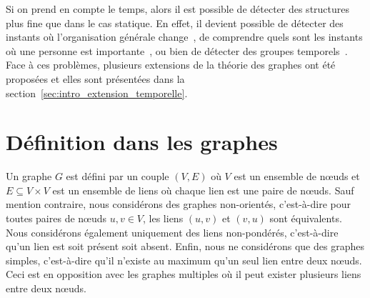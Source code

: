 Si on prend en compte le temps, alors il est possible de détecter des structures plus fine que dans le cas statique.
En effet, il devient possible de détecter des instants où l'organisation générale change~\cite{Rosvall2010}, de comprendre quels sont les instants où une personne est importante~\cite{Magnien2015}, ou bien de détecter des groupes temporels~\cite{Cazabet2010}.
Face à ces problèmes, plusieurs extensions de la théorie des graphes ont été proposées et elles sont présentées dans la section~\ref{sec:intro_extension_temporelle}.


\section{Définition dans les graphes}
\label{sec:def_graphe}

Un graphe $G$ est défini par un couple $(V, E)$  où $V$ est un ensemble de n\oe uds et $E \subseteq V \times V$ est un ensemble de liens où chaque lien est une paire de n\oe uds.
Sauf mention contraire, nous considérons des graphes non-orientés, c'est-à-dire pour toutes paires de n\oe uds $u,v \in V$, les liens $(u,v)$ et $(v,u)$ sont équivalents.
Nous considérons également uniquement des liens non-pondérés, c'est-à-dire qu'un lien est soit présent soit absent.
Enfin, nous ne considérons que des graphes simples, c'est-à-dire qu'il n'existe au maximum qu'un seul lien entre deux n\oe uds.
Ceci est en opposition avec les graphes multiples où il peut exister plusieurs liens entre deux n\oe uds.

